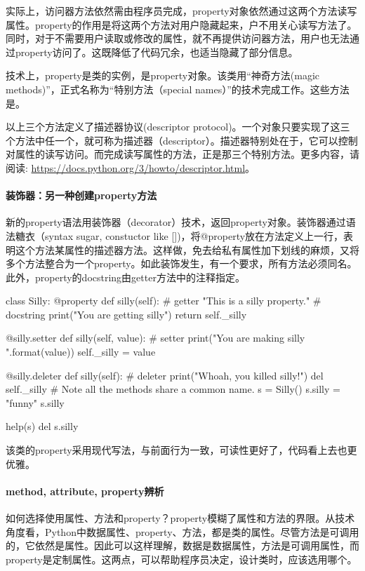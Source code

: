 实际上，访问器方法依然需由程序员完成，property对象依然通过这两个方法读写属性。property的作用是将这两个方法对用户隐藏起来，户不用关心读写方法了。同时，对于不需要用户读取或修改的属性，就不再提供访问器方法，用户也无法通过property访问了。这既降低了代码冗余，也适当隐藏了部分信息。

技术上，property是类的实例，是property对象。该类用“神奇方法(magic methods)”，正式名称为“特别方法（special names）”的技术完成工作。这些方法是。

以上三个方法定义了描述器协议(descriptor protocol)。一个对象只要实现了这三个方法中任一个，就可称为描述器（descriptor）。描述器特别处在于，它可以控制对属性的读写访问。而完成读写属性的方法，正是那三个特别方法。更多内容，请阅读: \url{https://docs.python.org/3/howto/descriptor.html}。
\paragraph{装饰器：另一种创建property方法}
新的property语法用装饰器（decorator）技术，返回property对象。装饰器通过语法糖衣（syntax sugar, constuctor like [])，将@property放在方法定义上一行，表明这个方法某属性的描述器方法。这样做，免去给私有属性加下划线的麻烦，又将多个方法整合为一个property。如此装饰发生，有一个要求，所有方法必须同名。此外，property的docstring由getter方法中的注释指定。
\begin{python}
class Silly:
    @property
    def silly(self):  # getter
        "This is a silly property."  # docstring
        print("You are getting silly")
        return self._silly

    @silly.setter
    def silly(self, value): #  setter
        print("You are making silly {}".format(value))
        self._silly = value

    @silly.deleter
    def silly(self):  # deleter
        print("Whoah, you killed silly!")
        del self._silly
# Note all the methods share a common name.
s = Silly()
s.silly = "funny"
s.silly

help(s)
del s.silly
\end{python}
该类的property采用现代写法，与前面行为一致，可读性更好了，代码看上去也更优雅。
\paragraph{method, attribute, property辨析}
如何选择使用属性、方法和property？property模糊了属性和方法的界限。从技术角度看，Python中数据属性、property、方法，都是类的属性。尽管方法是可调用的，它依然是属性。因此可以这样理解，数据是数据属性，方法是可调用属性，而property是定制属性。这两点，可以帮助程序员决定，设计类时，应该选用哪个。

